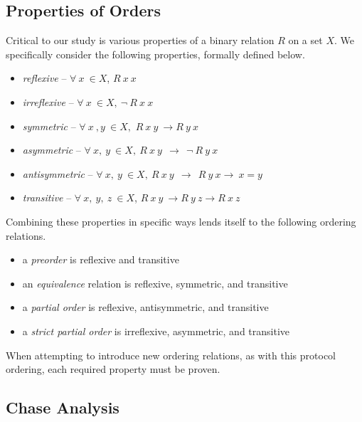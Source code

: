 \documentclass[runningheads]{llncs}
\theoremstyle{definition}
\newcommand{\squash}{\itemsep=0pt\parskip=0pt}
\begin{document}
\subsection*{Properties of Orders}

Critical to our study is various properties of a binary relation $R$ on a set $X$. We specifically consider the following properties, formally defined below.

\begin{itemize}
    \squash
    \item \emph{reflexive} -- $ \forall\: x\: \in X$, $R\: x\: x$
    \item \emph{irreflexive} -- $ \forall \: x\: \in X, \: \neg \: R\: x\: x$
    \item \emph{symmetric} -- $ \forall\: x\: , y\: \in X,$ $R\: x\: y\:\rightarrow R\: y\: x$
    \item \emph{asymmetric} --  $\forall\: x,\: y\:\in X,\: R\: x\: y\:\: \rightarrow  \:\: \neg \:R\: y\: x $  
    \item \emph{antisymmetric} --  $\forall\: x,\: y\:\in X,\: R\: x\: y\:\: \rightarrow \:\: R\: y\: x \rightarrow \:x = y$ 
    \item \emph{transitive} -- $ \forall\: x,\: y,\: z\:\in X$, $R\: x\: y\: \rightarrow R\: y\: z \rightarrow R\: x\: z$
\end{itemize}

\noindent Combining these properties in specific ways lends itself to the following ordering relations.

\begin{itemize}
    \squash
    \item a \emph{preorder} is reflexive and transitive
    \item an \emph{equivalence} relation is reflexive, symmetric, and transitive 
    \item a \emph{partial order} is reflexive, antisymmetric, and transitive 
    \item a \emph{strict partial order} is irreflexive, asymmetric, and transitive 
\end{itemize}

\noindent When attempting to introduce new ordering relations, as with this protocol ordering, each required property must be proven.  

\subsection*{Chase Analysis}
\end{document}
